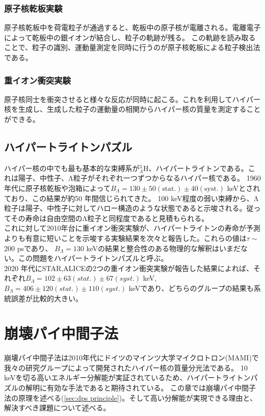\documentclass[a4paper,11pt,uplatex]{jsbook}
\begin{document}
\subsubsection{原子核乾板実験}
原子核乾板中を荷電粒子が通過すると、乾板中の原子核が電離される。電離電子によって乾板中の銀イオンが結合し、粒子の軌跡が残る。
この軌跡を読み取ることで、粒子の識別、運動量測定を同時に行うのが原子核乾板による粒子検出法である。
\subsubsection{重イオン衝突実験}
原子核同士を衝突させると様々な反応が同時に起こる。これを利用してハイパー核を生成し、生成した粒子の運動量の相関からハイパー核の質量を測定することができる。
\subsection{ハイパートライトンパズル}\label{sec:hypertriton puzzle}
ハイパー核の中でも最も基本的な束縛系が$^3_{\Lambda}\text{H}$、ハイパートライトンである。これは陽子、中性子、Λ粒子がそれぞれ一つずつからなるハイパー核である。
1960年代に原子核乾板や泡箱によって$B_{\Lambda} = 130 \pm 50(\text{stat.}) \pm 40(\text{syst.})$ keVとされており、この結果が約50 年間信じられてきた。
100 keV程度の弱い束縛から、Λ粒子は陽子、中性子に対してハロー構造のような状態であると示唆される。従ってその寿命は自由空間のΛ粒子と同程度であると見積もられる。\\
これに対して2010年台に重イオン衝突実験が、ハイパートライトンの寿命が予測よりも有意に短いことを示唆する実験結果を次々と報告した。これらの値は$\tau \sim$200 psであり、
$B_{\Lambda} = 130$ keVの結果と整合性のある物理的な解釈はいまだない。この問題をハイパートライトンパズルと呼ぶ。\\
2020 年代にSTAR,ALICEの2つの重イオン衝突実験が報告した結果によれば、それぞれ$B_{\Lambda}= 102 \pm 63(stat.) \pm 67(syst.)$ keV, 
$B_{\Lambda} = 406 \pm 120(stat.) \pm 110 (syst.)$ keVであり、どちらのグループの結果も系統誤差が比較的大きい。\\

\section{崩壊パイ中間子法}
崩壊パイ中間子法は2010年代にドイツのマインツ大学マイクロトロン(MAMI)で我々の研究グループによって開発されたハイパー核の質量分光法である\cite{esserObservation4Hyperhydrogen2015}。
10 keVを切る高いエネルギー分解能が実証されているため、ハイパートライトンパズルの解明に有効な手法であると期待されている。
この章では崩壊パイ中間子法の原理を述べる(\ref{sec:dps principle})。そして高い分解能が実現できる理由と、解決すべき課題について述べる。
\end{document}

